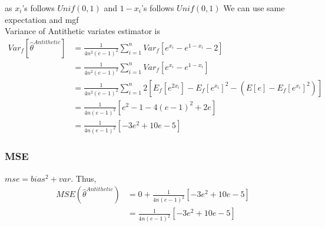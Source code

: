 \documentclass[11pt]{article}
\begin{document}
as \(x_i\)'s follows \(Unif(0,1)\) and \(1-x_i\)'s follows \(Unif(0,1)\)
We can use same expectation and mgf\\
Variance of Antithetic variates estimator is \[
\begin{align*}
Var_f[\hat{\theta}^{Antithetic}] & = \frac{1}{4n^2 (e-1)^2}\sum_{i=1}^{n}Var_f\left[e^{x_i} - e^{1-x_i} -2\right]\\
&= \frac{1}{4n^2 (e-1)^2}\sum_{i=1}^{n}Var_f\left[e^{x_i} - e^{1-x_i}\right]\\
&=\frac{1}{4n^2 (e-1)^2}\sum_{i=1}^{n}2\left[E_f[e^{2x_i}]-E_f[e^{x_i}]^2 -\left(E[e] - E_f[e^{x_i}]^2\right)\right]\\
&=\frac{1}{4n (e-1)^2}\left[e^2-1 -4(e-1)^2 + 2e\right]\\
&=\frac{1}{4n (e-1)^2}\left[-3e^2 + 10e -5\right]
\end{align*}
\]

    \subsubsection{MSE}\label{mse}

\(mse = bias^2 + var\). Thus, \[
\begin{align*}
MSE(\hat{\theta}^{Antithetic}) &= 0 + \frac{1}{4n (e-1)^2}\left[-3e^2 + 10e -5\right]\\ 
&= \frac{1}{4n (e-1)^2}\left[-3e^2 + 10e -5\right]
\end{align*}
\]
\end{document}
